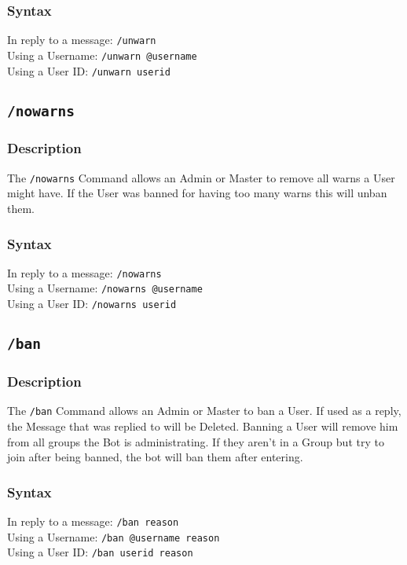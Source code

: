 \documentclass[a4paper]{article}
\begin{document}
        \subsubsection*{Syntax}
            In reply to a message: \texttt{/unwarn}\\
            Using a Username: \texttt{/unwarn @username}\\
            Using a User ID: \texttt{/unwarn userid}

    \subsection{\texttt{/nowarns}}
        \subsubsection*{Description}
            The \texttt{/nowarns} Command allows an Admin or Master to remove all warns a User might have. If the User was banned for having too many warns this will unban them.

        \subsubsection*{Syntax}
            In reply to a message: \texttt{/nowarns}\\
            Using a Username: \texttt{/nowarns @username}\\
            Using a User ID: \texttt{/nowarns userid}


    \subsection{\texttt{/ban}}
        \subsubsection*{Description}
            The \texttt{/ban} Command allows an Admin or Master to ban a User. If used as a reply, the Message that was replied to will be Deleted. Banning a User will remove him from all groups the Bot is administrating. If they aren't in a Group but try to join after being banned, the bot will ban them after entering.

        \subsubsection*{Syntax}
            In reply to a message: \texttt{/ban reason}\\
            Using a Username: \texttt{/ban @username reason}\\
            Using a User ID: \texttt{/ban userid reason}
\end{document}
